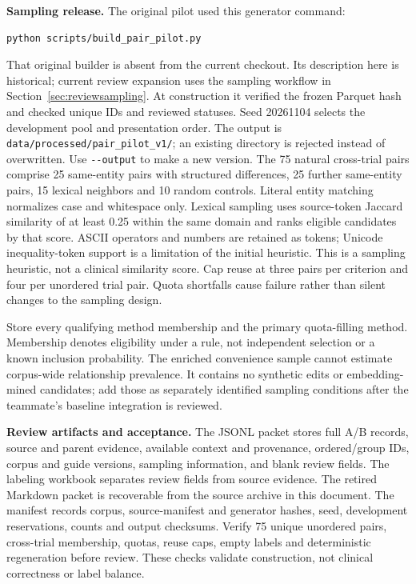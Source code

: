 \documentclass[10pt,letterpaper]{article}
\newcommand{\pathcode}[1]{\nolinkurl{#1}}
\begin{document}
\textbf{Sampling release.} The original pilot used this generator command:
\begin{verbatim}
python scripts/build_pair_pilot.py
\end{verbatim}
That original builder is absent from the current checkout. Its description
here is historical; current review expansion uses the sampling workflow in
Section~\ref{sec:reviewsampling}. At construction it verified the frozen Parquet hash and checked unique
IDs and reviewed statuses. Seed 20261104 selects the development pool and
presentation order. The output is
\pathcode{data/processed/pair_pilot_v1/}; an existing directory is rejected
instead of overwritten. Use \pathcode{--output} to make a new version.
The 75 natural cross-trial pairs comprise 25 same-entity pairs with structured
differences, 25 further same-entity pairs, 15 lexical neighbors and 10 random
controls. Literal entity matching normalizes case and whitespace only.
Lexical sampling uses source-token Jaccard similarity of at least 0.25
within the same domain and ranks eligible candidates by that score.
ASCII operators and numbers are retained as tokens; Unicode inequality-token
support is a limitation of the initial heuristic. This is a sampling heuristic,
not a clinical similarity score. Cap reuse at three pairs per criterion and
four per unordered trial pair. Quota shortfalls cause failure rather than
silent changes to the sampling design.

Store every qualifying method membership and the primary quota-filling
method. Membership denotes eligibility under a rule, not independent
selection or a known inclusion probability. The enriched convenience sample
cannot estimate corpus-wide relationship prevalence. It contains no synthetic
edits or embedding-mined candidates; add those as separately identified
sampling conditions after the teammate's baseline integration is reviewed.

\textbf{Review artifacts and acceptance.} The JSONL packet stores full A/B
records, source and parent evidence, available context and provenance,
ordered/group IDs, corpus and guide versions, sampling information, and blank
review fields. The labeling workbook separates review fields from source evidence. The
retired Markdown packet is recoverable from the source archive in this document. The manifest records corpus, source-manifest and generator hashes,
seed, development reservations, counts and output checksums. Verify 75 unique
unordered pairs, cross-trial membership, quotas, reuse caps, empty labels and
deterministic regeneration before review. These checks validate construction,
not clinical correctness or label balance.
\end{document}
